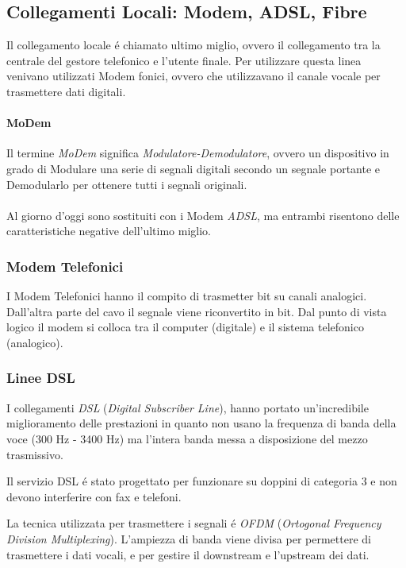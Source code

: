 \documentclass[12pt]{article}
\begin{document}
\subsection{Collegamenti Locali: Modem, ADSL, Fibre}
Il collegamento locale \'e chiamato ultimo miglio, ovvero il collegamento tra la centrale del gestore telefonico e 
l'utente finale. Per utilizzare questa linea venivano utilizzati Modem fonici, ovvero che utilizzavano il canale 
vocale per trasmettere dati digitali.

\paragraph{MoDem} Il termine \textit{MoDem} significa \textit{Modulatore-Demodulatore}, ovvero un dispositivo in 
grado di Modulare una serie di segnali digitali secondo un segnale portante e Demodularlo per ottenere tutti i 
segnali originali.\\\\
Al giorno d'oggi sono sostituiti con i Modem \textit{ADSL}, ma entrambi risentono delle caratteristiche negative 
dell'ultimo miglio.

\subsubsection{Modem Telefonici}
I Modem Telefonici hanno il compito di trasmetter bit su canali analogici. Dall'altra parte del cavo il segnale viene
riconvertito in bit. Dal punto di vista logico il modem si colloca tra il computer (digitale) e il sistema telefonico
(analogico).

\subsubsection{Linee DSL}
I collegamenti \textit{DSL} (\textit{Digital Subscriber Line}), hanno portato un'incredibile miglioramento delle
prestazioni in quanto non usano la frequenza di banda della voce (300 Hz - 3400 Hz) ma l'intera banda messa a 
disposizione del mezzo trasmissivo. 

Il servizio DSL \'e stato progettato per funzionare su doppini di categoria 3 e non devono interferire con fax e 
telefoni.

La tecnica utilizzata per trasmettere i segnali \'e \textit{OFDM} (\textit{Ortogonal Frequency Division 
Multiplexing}). L'ampiezza di banda viene divisa per permettere di trasmettere  i dati vocali, e per gestire il 
downstream e l'upstream dei dati.
\end{document}
